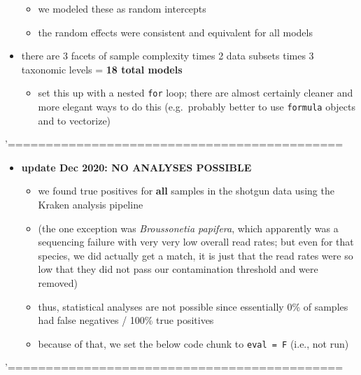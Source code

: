 \documentclass[
]{article}
\providecommand{\tightlist}{%
  \setlength{\itemsep}{0pt}\setlength{\parskip}{0pt}}
\begin{document}
\begin{itemize}
  \begin{itemize}
  \tightlist
  \item
    we modeled these as random intercepts
  \item
    the random effects were consistent and equivalent for all models
  \end{itemize}
\item
  there are 3 facets of sample complexity times 2 data subsets times 3
  taxonomic levels = \textbf{18 total models}

  \begin{itemize}
  \tightlist
  \item
    set this up with a nested \texttt{for} loop; there are almost
    certainly cleaner and more elegant ways to do this (e.g.~probably
    better to use \texttt{formula} objects and to vectorize)
  \end{itemize}
\end{itemize}

'============================================

\begin{itemize}
\tightlist
\item
  \textbf{update Dec 2020: NO ANALYSES POSSIBLE}

  \begin{itemize}
  \tightlist
  \item
    we found true positives for \textbf{all} samples in the shotgun data
    using the Kraken analysis pipeline
  \item
    (the one exception was \emph{Broussonetia papifera}, which
    apparently was a sequencing failure with very very low overall read
    rates; but even for that species, we did actually get a match, it is
    just that the read rates were so low that they did not pass our
    contamination threshold and were removed)
  \item
    thus, statistical analyses are not possible since essentially 0\% of
    samples had false negatives / 100\% true positives
  \item
    because of that, we set the below code chunk to \texttt{eval\ =\ F}
    (i.e., not run)
  \end{itemize}
\end{itemize}

'============================================
\end{document}
